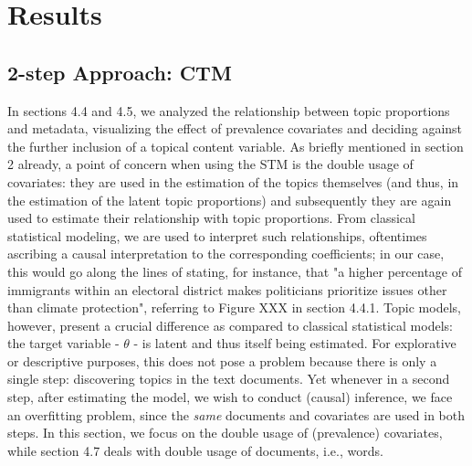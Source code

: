 \documentclass[12pt]{article}
\begin{document}
\section{Results}

\subsection{2-step Approach: CTM}

In sections 4.4 and 4.5, we analyzed the relationship between topic proportions and metadata, visualizing the effect of prevalence covariates and deciding against the further inclusion of a topical content variable. As briefly mentioned in section 2 already, a point of concern when using the STM is the double usage of covariates: they are used in the estimation of the topics themselves (and thus, in the estimation of the latent topic proportions) and subsequently they are again used to estimate their relationship with topic proportions. From classical statistical modeling, we are used to interpret such relationships, oftentimes ascribing a causal interpretation to the corresponding coefficients; in our case, this would go along the lines of stating, for instance, that "a higher percentage of immigrants within an electoral district makes politicians prioritize issues other than climate protection", referring to Figure XXX in section 4.4.1. Topic models, however, present a crucial difference as compared to classical statistical models: the target variable - $\theta$ - is latent and thus itself being estimated. For explorative or descriptive purposes, this does not pose a problem because there is only a single step: discovering topics in the text documents. Yet whenever in a second step, after estimating the model, we wish to conduct (causal) inference, we face an overfitting problem, since the \textit{same} documents and covariates are used in both steps. In this section, we focus on the double usage of (prevalence) covariates, while section 4.7 deals with double usage of documents, i.e., words.
\end{document}
